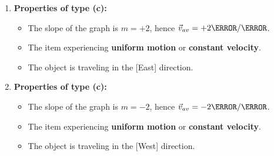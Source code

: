 \documentclass[12pt]{article}
\theoremstyle{break}
\begin{document}
\begin{enumerate}[label = (\alph*)]
	\item 
		
		\textbf{\large{Properties of type (c):}}
		\begin{itemize}
			\item The slope of the graph is $m = +2$, hence $\vec v_{av} = +2\m / \s$.
			\item The item experiencing \textbf{uniform motion} or \textbf{constant velocity}.
			\item The object is traveling in the [East] direction.
		\end{itemize}

	\item 
		
		\textbf{\large{Properties of type (c):}}
		\begin{itemize}
			\item The slope of the graph is $m = -2$, hence $\vec v_{av} = -2\m / \s$.
			\item The item experiencing \textbf{uniform motion} or \textbf{constant velocity}.
			\item The object is traveling in the [West] direction.
		\end{itemize}

\end{enumerate}
\end{document}

